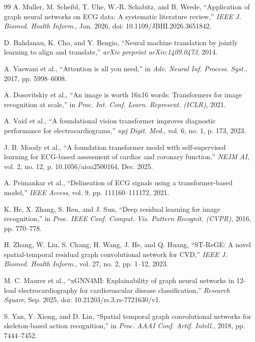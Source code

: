 \documentclass[12pt,a4paper]{report}
\begin{document}
\begin{thebibliography}{99}
A. Muller, M. Scheibl, T. Uhe, W.-R. Schabitz, and B. Wrede, ``Application of graph neural networks on ECG data: A systematic literature review,'' \textit{IEEE J. Biomed. Health Inform.}, Jan. 2026, doi: 10.1109/JBHI.2026.3651842.

D. Bahdanau, K. Cho, and Y. Bengio, ``Neural machine translation by jointly learning to align and translate,'' \textit{arXiv preprint arXiv:1409.0473}, 2014.

A. Vaswani et al., ``Attention is all you need,'' in \textit{Adv. Neural Inf. Process. Syst.}, 2017, pp. 5998--6008.

A. Dosovitskiy et al., ``An image is worth 16x16 words: Transformers for image recognition at scale,'' in \textit{Proc. Int. Conf. Learn. Represent. (ICLR)}, 2021.

A. Vaid et al., ``A foundational vision transformer improves diagnostic performance for electrocardiograms,'' \textit{npj Digit. Med.}, vol. 6, no. 1, p. 173, 2023.

J. B. Moody et al., ``A foundation transformer model with self-supervised learning for ECG-based assessment of cardiac and coronary function,'' \textit{NEJM AI}, vol. 2, no. 12, p. 10.1056/aioa2500164, Dec. 2025.

A. Peimankar et al., ``Delineation of ECG signals using a transformer-based model,'' \textit{IEEE Access}, vol. 9, pp. 111160--111172, 2021.

K. He, X. Zhang, S. Ren, and J. Sun, ``Deep residual learning for image recognition,'' in \textit{Proc. IEEE Conf. Comput. Vis. Pattern Recognit. (CVPR)}, 2016, pp. 770--778.

H. Zhang, W. Liu, S. Chang, H. Wang, J. He, and Q. Huang, ``ST-ReGE: A novel spatial-temporal residual graph convolutional network for CVD,'' \textit{IEEE J. Biomed. Health Inform.}, vol. 27, no. 2, pp. 1--12, 2023.

M. C. Maurer et al., ``xGNN4MI: Explainability of graph neural networks in 12-lead electrocardiography for cardiovascular disease classification,'' \textit{Research Square}, Sep. 2025, doi: 10.21203/rs.3.rs-7721630/v1.

S. Yan, Y. Xiong, and D. Lin, ``Spatial temporal graph convolutional networks for skeleton-based action recognition,'' in \textit{Proc. AAAI Conf. Artif. Intell.}, 2018, pp. 7444--7452.


\end{thebibliography}
\end{document}
